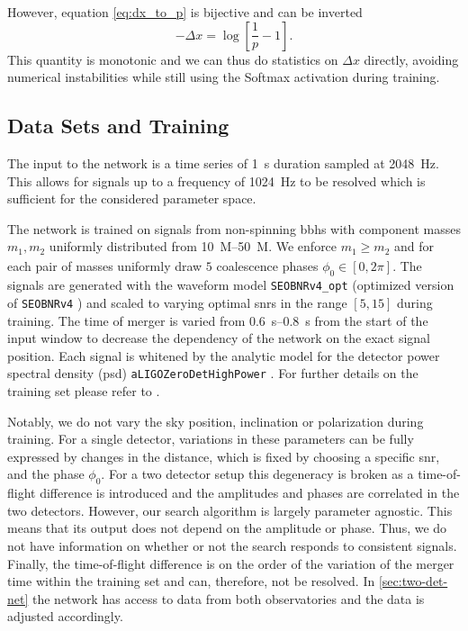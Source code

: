 However, equation \eqref{eq:dx_to_p} is bijective and can be inverted
\begin{equation}\label{eq:p_to_dx}
-\Delta x = \log\left[\frac{1}{p} - 1\right].
\end{equation}
This quantity is monotonic and we can thus do statistics on $\Delta x$ directly, avoiding numerical instabilities while still using the Softmax activation during training.

\subsection{Data Sets and Training}\label{sec:training:data}
The input to the network is a time series of \SI{1}{\second} duration sampled at \SI{2048}{\hertz}. This allows for signals up to a frequency of \SI{1024}{\hertz} to be resolved which is sufficient for the considered parameter space.

The network is trained on signals from non-spinning \acrshort{bbh}s with component masses $m_1, m_2$ uniformly distributed from \SIrange{10}{50}{M_\odot}. We enforce $m_1\geq m_2$ and for each pair of masses uniformly draw $5$ coalescence phases $\phi_0\in\left[0,2\pi\right]$. The signals are generated with the waveform model \verb|SEOBNRv4_opt| \cite{Devine:2016ovp} (optimized version of \verb|SEOBNRv4| \cite{Bohe:2016gbl}) and scaled to varying optimal \acrshort{snr}s in the range $\left[5,15\right]$ during training. The time of merger is varied from \SIrange{0.6}{0.8}{\second} from the start of the input window to decrease the dependency of the network on the exact signal position. Each signal is whitened by the analytic model for the detector power spectral density (\acrshort{psd}) \verb|aLIGOZeroDetHighPower| \cite{lalsuite}. For further details on the training set please refer to \cite{Schafer:2021fea}.

Notably, we do not vary the sky position, inclination or polarization during training. For a single detector, variations in these parameters can be fully expressed by changes in the distance, which is fixed by choosing a specific \acrshort{snr}, and the phase $\phi_0$. For a two detector setup this degeneracy is broken as a time-of-flight difference is introduced and the amplitudes and phases are correlated in the two detectors. However, our search algorithm is largely parameter agnostic. This means that its output does not depend on the amplitude or phase. Thus, we do not have information on whether or not the search responds to consistent signals. Finally, the time-of-flight difference is on the order of the variation of the merger time within the training set and can, therefore, not be resolved. In \autoref{sec:two-det-net} the network has access to data from both observatories and the data is adjusted accordingly.

